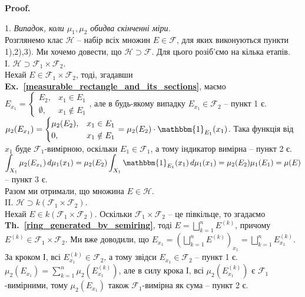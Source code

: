 \documentclass[a4paper, 10pt]{article}
\makeatletter
\theoremstyle{theoremdd}
\newcommand\thref[1]{\textbf{Th.~\ref{#1}}}
\newcommand\exref[1]{\textbf{Ex.~\ref{#1}}}
\renewenvironment{proof}[1][Proof.\\]{\par
\pushQED{\hfill \qed}%
\normalfont \topsep6\p@\@plus6\p@\relax
\trivlist
\item\relax
{\bfseries
#1\@addpunct{.}}\hspace\labelsep\ignorespaces
}{%
\popQED\endtrivlist\@endpefalse
}
\makeatother
\begin{document}
\begin{proof}
1. \textit{Випадок, коли $\mu_1,\mu_2$ обидва скінченні міри.}\\
Розглянемо клас $\mathcal{H}$ -- набір всіх множин $E \in \mathcal{F}$, для яких виконуються пункти 1),2),3). Ми хочемо довести, що $\mathcal{H} \supset \mathcal{F}$. Для цього розіб'ємо на кілька етапів.
\bigskip \\
I. $\mathcal{H} \supset \mathcal{F}_1 \times \mathcal{F}_2$.\\
Нехай $E \in \mathcal{F}_1 \times \mathcal{F}_2$, тоді, згадавши \exref{measurable_rectangle_and_its_sections}, маємо $E_{x_1} = \begin{cases} E_2, & x_1 \in E_1 \\ \emptyset, & x_1 \notin E_1 \end{cases}$, але в будь-якому випадку $E_{x_1} \in \mathcal{F}_2$ -- пункт 1 є.\\
$\mu_2(E_{x_1}) = \begin{cases} \mu_2(E_2), & x_1 \in E_1 \\ 0, & x_1 \notin E_1 \end{cases} = \mu_2(E_2) \cdot \mathbbm{1}_{E_1}(x_1)$. Така функція від $x_1$ буде $\mathcal{F}_1$-вимірною, оскільки $E_1 \in \mathcal{F}_1$, а тому індикатор вимірна -- пункт 2 є.\\
$\displaystyle\int_{X_1} \mu_2(E_{x_1})\,d \mu_1(x_1) = \mu_2(E_2) \int_{X_1} \mathbbm{1}_{E_1}(x_1)\,d\mu_1(x_1) = \mu_2(E_2) \mu_1(E_1) = \mu(E)$ -- пункт 3 є.\\
Разом ми отримали, що множина $E \in \mathcal{H}$.
\bigskip \\
II. $\mathcal{H} \supset k(\mathcal{F}_1 \times \mathcal{F}_2)$.\\
Нехай $E \in k(\mathcal{F}_1 \times \mathcal{F}_2)$. Оскільки $\mathcal{F}_1 \times \mathcal{F}_2$ -- це півкільце, то згадаємо \thref{ring_generated_by_semiring}, тоді $E = \displaystyle\bigsqcup_{k=1}^n E^{(k)}$, причому $E^{(k)} \in \mathcal{F}_1 \times \mathcal{F}_2$. Ми вже доводили, що $\displaystyle E_{x_1} = \left( \bigsqcup_{k=1}^n E^{(k)} \right)_{x_1} = \bigsqcup_{k=1}^n E_{x_1}^{(k)}$. За кроком І, всі $E_{x_1}^{(k)} \in \mathcal{F}_2$, а тому звідси $E_{x_1} \in \mathcal{F}_2$ -- пункт 1 є.\\
$\mu_2(E_{x_1}) = \displaystyle\sum_{k=1}^n \mu_2\left(E_{x_1}^{(k)}\right)$, але в силу крока І, всі $\mu_2\left(E_{x_1}^{(k)}\right)$ є $\mathcal{F}_1$-вимірними, тому $\mu_2(E_{x_1})$ також $\mathcal{F}_1$-вимірна як сума -- пункт 2 є.\\

\end{proof}
\end{document}
